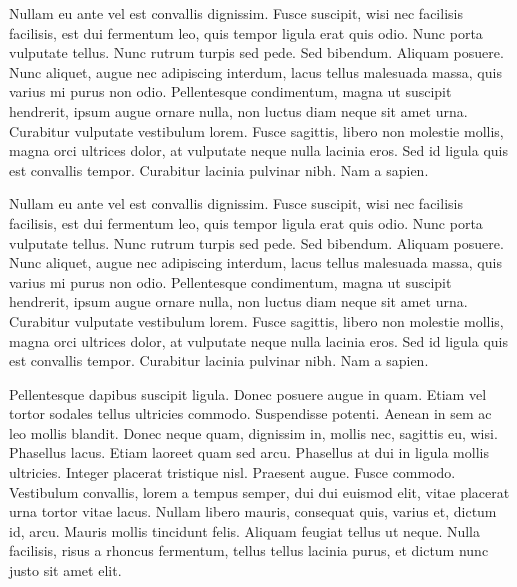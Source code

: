 Nullam eu ante vel est convallis dignissim.  Fusce suscipit, wisi nec
facilisis facilisis, est dui fermentum leo, quis tempor ligula erat
quis odio.  Nunc porta vulputate tellus.  Nunc rutrum turpis sed pede.
Sed bibendum.  Aliquam posuere.  Nunc aliquet, augue nec adipiscing
interdum, lacus tellus malesuada massa, quis varius mi purus non odio.
Pellentesque condimentum, magna ut suscipit hendrerit, ipsum augue
ornare nulla, non luctus diam neque sit amet urna.  Curabitur
vulputate vestibulum lorem.  Fusce sagittis, libero non molestie
mollis, magna orci ultrices dolor, at vulputate neque nulla lacinia
eros.  Sed id ligula quis est convallis tempor.  Curabitur lacinia
pulvinar nibh.  Nam a sapien.

Nullam eu ante vel est convallis dignissim.  Fusce suscipit, wisi nec
facilisis facilisis, est dui fermentum leo, quis tempor ligula erat
quis odio.  Nunc porta vulputate tellus.  Nunc rutrum turpis sed pede.
Sed bibendum.  Aliquam posuere.  Nunc aliquet, augue nec adipiscing
interdum, lacus tellus malesuada massa, quis varius mi purus non odio.
Pellentesque condimentum, magna ut suscipit hendrerit, ipsum augue
ornare nulla, non luctus diam neque sit amet urna.  Curabitur
vulputate vestibulum lorem.  Fusce sagittis, libero non molestie
mollis, magna orci ultrices dolor, at vulputate neque nulla lacinia
eros.  Sed id ligula quis est convallis tempor.  Curabitur lacinia
pulvinar nibh.  Nam a sapien.


Pellentesque dapibus suscipit ligula.  Donec posuere augue in quam.
Etiam vel tortor sodales tellus ultricies commodo.  Suspendisse
potenti.  Aenean in sem ac leo mollis blandit.  Donec neque quam,
dignissim in, mollis nec, sagittis eu, wisi.  Phasellus lacus.  Etiam
laoreet quam sed arcu.  Phasellus at dui in ligula mollis ultricies.
Integer placerat tristique nisl.  Praesent augue.  Fusce commodo.
Vestibulum convallis, lorem a tempus semper, dui dui euismod elit,
vitae placerat urna tortor vitae lacus.  Nullam libero mauris,
consequat quis, varius et, dictum id, arcu.  Mauris mollis tincidunt
felis.  Aliquam feugiat tellus ut neque.  Nulla facilisis, risus a
rhoncus fermentum, tellus tellus lacinia purus, et dictum nunc justo
sit amet elit.

